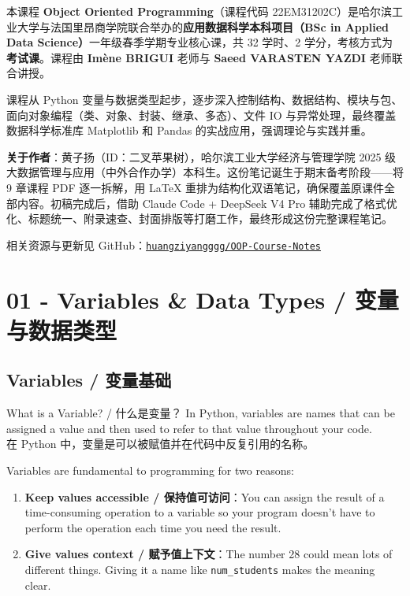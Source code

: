 \documentclass[11pt,a4paper]{report}
\let\oldtexttt\texttt
\renewcommand{\texttt}[1]{\textcolor{mainblue}{\oldtexttt{#1}}}
\begin{document}
本课程 \textbf{Object Oriented Programming}（课程代码 22EM31202C）是哈尔滨工业大学与法国里昂商学院联合举办的\textbf{应用数据科学本科项目（BSc in Applied Data Science）}一年级春季学期专业核心课，共 32 学时、2 学分，考核方式为\textbf{考试课}。课程由 \textbf{Imène BRIGUI} 老师与 \textbf{Saeed VARASTEN YAZDI} 老师联合讲授。

课程从 Python 变量与数据类型起步，逐步深入控制结构、数据结构、模块与包、面向对象编程（类、对象、封装、继承、多态）、文件 IO 与异常处理，最终覆盖数据科学标准库 Matplotlib 和 Pandas 的实战应用，强调理论与实践并重。

\vspace{1em}

\noindent \textbf{关于作者}：黄子扬（ID：二叉苹果树），哈尔滨工业大学经济与管理学院 2025 级大数据管理与应用（中外合作办学）本科生。这份笔记诞生于期末备考阶段——将 9 章课程 PDF 逐一拆解，用 \LaTeX{} 重排为结构化双语笔记，确保覆盖原课件全部内容。初稿完成后，借助 Claude Code + DeepSeek V4 Pro 辅助完成了格式优化、标题统一、附录速查、封面排版等打磨工作，最终形成这份完整课程笔记。

相关资源与更新见 GitHub：\href{https://github.com/huangziyangggg/OOP-Course-Notes}{\texttt{huangziyangggg/OOP-Course-Notes}}

\newpage

\tableofcontents
\newpage

\chapter{01 - Variables \& Data Types / 变量与数据类型}



\section{Variables / 变量基础}

\begin{concept}{What is a Variable? / 什么是变量？}
    In Python, variables are names that can be assigned a value and then used to refer to that value throughout your code. \\
    在 Python 中，变量是可以被赋值并在代码中反复引用的名称。

    Variables are fundamental to programming for two reasons:
    \begin{enumerate}[itemsep=0.3em]
        \item \textbf{Keep values accessible / 保持值可访问}：You can assign the result of a time-consuming operation to a variable so your program doesn't have to perform the operation each time you need the result.
        \item \textbf{Give values context / 赋予值上下文}：The number 28 could mean lots of different things. Giving it a name like \texttt{num\_students} makes the meaning clear.
    \end{enumerate}
\end{concept}
\end{document}
